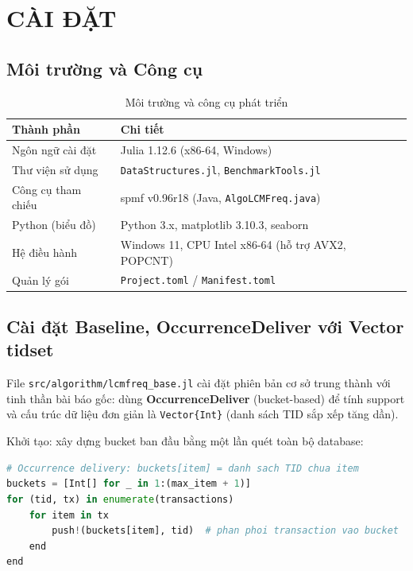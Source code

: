 \documentclass[12pt,a4paper]{article}
\theoremstyle{definition}
\begin{document}
\section{CÀI ĐẶT}
\label{sec:implementation}

\subsection{Môi trường và Công cụ}

\begin{table}[H]
\centering
\small
\begin{tabular}{l l}
    \toprule
    \textbf{Thành phần} & \textbf{Chi tiết} \\
    \midrule
    Ngôn ngữ cài đặt  & Julia 1.12.6 (x86-64, Windows) \\
    Thư viện sử dụng  & \texttt{DataStructures.jl}, \texttt{BenchmarkTools.jl} \\
    Công cụ tham chiếu & \gls{spmf} v0.96r18 (Java, \texttt{AlgoLCMFreq.java}) \\
    Python (biểu đồ)  & Python 3.x, matplotlib 3.10.3, seaborn \\
    Hệ điều hành      & Windows 11, CPU Intel x86-64 (hỗ trợ AVX2, POPCNT) \\
    Quản lý gói       & \texttt{Project.toml} / \texttt{Manifest.toml} \\
    \bottomrule
\end{tabular}
\caption{Môi trường và công cụ phát triển}
\label{tab:env}
\end{table}

\subsection{Cài đặt Baseline, OccurrenceDeliver với Vector tidset}

File \texttt{src/algorithm/lcmfreq\_base.jl} cài đặt phiên bản cơ sở trung thành với tinh thần bài báo gốc: dùng \textbf{OccurrenceDeliver} (bucket-based) để tính support và cấu trúc dữ liệu đơn giản là \texttt{Vector\{Int\}} (danh sách TID sắp xếp tăng dần).

Khởi tạo: xây dựng bucket ban đầu bằng một lần quét toàn bộ database:

\begin{lstlisting}[language=Python, caption={Xây dựng bucket ban đầu bằng OccurrenceDeliver (Baseline)}, label=lst:baseline_bucket]
# Occurrence delivery: buckets[item] = danh sach TID chua item
buckets = [Int[] for _ in 1:(max_item + 1)]
for (tid, tx) in enumerate(transactions)
    for item in tx
        push!(buckets[item], tid)  # phan phoi transaction vao bucket
    end
end
\end{lstlisting}
\end{document}
